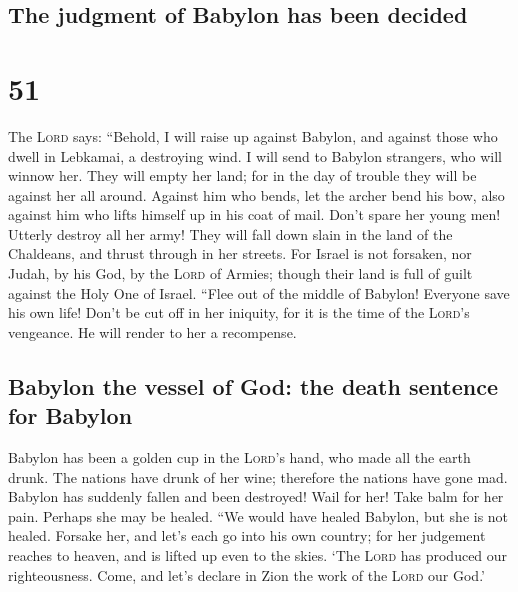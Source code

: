 \hypertarget{the-judgment-of-babylon-has-been-decided}{%
\subsection{The judgment of Babylon has been
decided}\label{the-judgment-of-babylon-has-been-decided}}

\hypertarget{section-50}{%
\section{51}\label{section-50}}

 The \textsc{Lord} says: ``Behold, I will raise up against
Babylon, and against those who dwell in Lebkamai, a destroying wind.
 I will send to Babylon strangers, who will winnow her.
They will empty her land; for in the day of trouble they will be against
her all around.  Against him who bends, let the archer
bend his bow, also against him who lifts himself up in his coat of mail.
Don't spare her young men! Utterly destroy all her army! 
They will fall down slain in the land of the Chaldeans, and thrust
through in her streets.  For Israel is not forsaken, nor
Judah, by his God, by the \textsc{Lord} of Armies; though their land is
full of guilt against the Holy One of Israel.  ``Flee out
of the middle of Babylon! Everyone save his own life! Don't be cut off
in her iniquity, for it is the time of the \textsc{Lord}'s vengeance. He
will render to her a recompense.

\hypertarget{babylon-the-vessel-of-god-the-death-sentence-for-babylon}{%
\subsection{Babylon the vessel of God: the death sentence for
Babylon}\label{babylon-the-vessel-of-god-the-death-sentence-for-babylon}}

 Babylon has been a golden cup in the \textsc{Lord}'s
hand, who made all the earth drunk. The nations have drunk of her wine;
therefore the nations have gone mad.  Babylon has suddenly
fallen and been destroyed! Wail for her! Take balm for her pain. Perhaps
she may be healed.  ``We would have healed Babylon, but
she is not healed. Forsake her, and let's each go into his own country;
for her judgement reaches to heaven, and is lifted up even to the skies.
 `The \textsc{Lord} has produced our righteousness. Come,
and let's declare in Zion the work of the \textsc{Lord} our God.'

